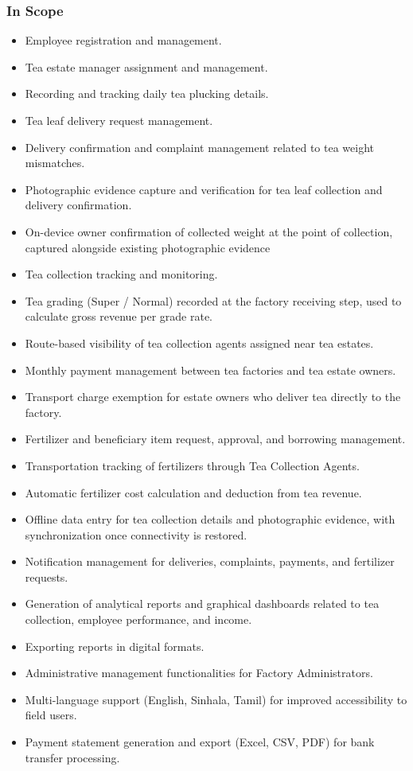 \subsubsection{In Scope}
\begin{itemize}
    \item Employee registration and management.
    \item Tea estate manager assignment and management.
    \item Recording and tracking daily tea plucking details.
    \item Tea leaf delivery request management.
    \item Delivery confirmation and complaint management related to tea weight mismatches.
    \item Photographic evidence capture and verification for tea leaf collection and delivery confirmation.
    \item On-device owner confirmation of collected weight at the point of collection, captured alongside existing photographic evidence 
    \item Tea collection tracking and monitoring.
    \item Tea grading (Super / Normal) recorded at the factory receiving step, used to calculate gross revenue per grade rate. 
    \item Route-based visibility of tea collection agents assigned near tea estates.
    \item Monthly payment management between tea factories and tea estate owners.
    \item Transport charge exemption for estate owners who deliver tea directly to the factory. 
    \item Fertilizer and beneficiary item request, approval, and borrowing management.
    \item Transportation tracking of fertilizers through Tea Collection Agents.
    \item Automatic fertilizer cost calculation and deduction from tea revenue.
    \item Offline data entry for tea collection details and photographic evidence, with synchronization once connectivity is restored.
    \item Notification management for deliveries, complaints, payments, and fertilizer requests.
    \item Generation of analytical reports and graphical dashboards related to tea collection, employee performance, and income.
    \item Exporting reports in digital formats.
    \item Administrative management functionalities for Factory Administrators.
    \item Multi-language support (English, Sinhala, Tamil) for improved accessibility to field users.
    \item Payment statement generation and export (Excel, CSV, PDF) for bank transfer processing. 
\end{itemize}

